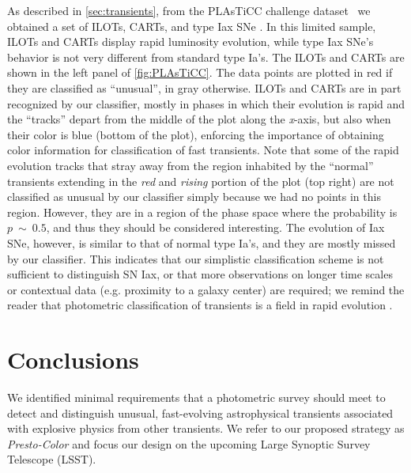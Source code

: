 \documentclass[letterpaper,longauthor,trackchanges,twocolumn,onecolappendix,sort&compress]{aastex62}
\begin{document}
As described in \autoref{sec:transients}, from the PLAsTiCC challenge dataset~\citep{plasticc} we obtained a set of  ILOTs, CARTs, and type Iax SNe \citep[][and references therein]{Jha2017}. In this limited sample, ILOTs and CARTs display rapid luminosity evolution, while type Iax SNe's behavior is not very different from standard type Ia's. The ILOTs and CARTs are shown in the left panel of \autoref{fig:PLAsTiCC}. The data points are plotted in red if they are classified as ``unusual'', in gray otherwise. ILOTs and CARTs are in part recognized by our classifier, mostly in phases in which their evolution is rapid and the ``tracks'' depart from the middle of the plot along the \emph{x}-axis, but also when their color is blue (bottom of the plot), enforcing the importance of obtaining color information for classification of fast transients. Note that some of the rapid evolution tracks that stray away from the region inhabited by the ``normal'' transients extending in the \emph{red} and \emph{rising} portion of the plot (top right) are not classified as unusual by our classifier simply because we had no points in this region. However, they are in a region of the phase space where the probability is $p~\sim~0.5$, and thus they should be considered interesting. The evolution of Iax SNe, however, is similar to that of normal type Ia's, and they are mostly missed by our classifier. This indicates that our simplistic classification scheme is not sufficient to distinguish SN Iax, or that more observations on longer time scales or contextual data (e.g. proximity to a galaxy center) are required; we remind the reader that photometric classification of transients is a field in rapid evolution \citep[\emph{e.g.}][]{plasticc}.

\section{Conclusions}
We identified minimal requirements that a photometric survey should meet to detect and distinguish unusual, fast-evolving astrophysical transients associated with explosive physics from other transients. We refer to our proposed strategy as {\em Presto-Color} and focus our design on the upcoming Large Synoptic Survey Telescope (LSST). 
\end{document}
